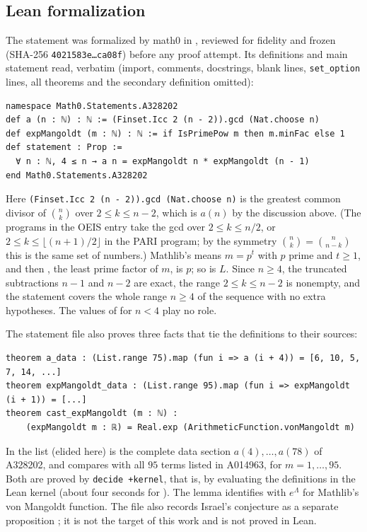 \documentclass[11pt]{amsart}
\theoremstyle{plain}
\theoremstyle{definition}
\begin{document}
\subsection*{Lean formalization}
The statement was formalized by math0 in , reviewed for fidelity and frozen (SHA-256 \texttt{4021583e\ldots ca08f}) before any proof attempt. Its definitions and main statement read, verbatim (import, comments, docstrings, blank lines, \texttt{set\_option} lines, all theorems and the secondary definition  omitted):
\begin{lstlisting}
namespace Math0.Statements.A328202
def a (n : ℕ) : ℕ := (Finset.Icc 2 (n - 2)).gcd (Nat.choose n)
def expMangoldt (m : ℕ) : ℕ := if IsPrimePow m then m.minFac else 1
def statement : Prop :=
  ∀ n : ℕ, 4 ≤ n → a n = expMangoldt n * expMangoldt (n - 1)
end Math0.Statements.A328202
\end{lstlisting}
Here \texttt{(Finset.Icc 2 (n - 2)).gcd (Nat.choose n)} is the greatest common divisor of $\binom nk$ over $2\le k\le n-2$, which is $a(n)$ by the discussion above. (The programs in the OEIS entry take the gcd over $2\le k\le n/2$, or $2\le k\le\lfloor (n+1)/2\rfloor$ in the PARI program; by the symmetry $\binom nk=\binom n{n-k}$ this is the same set of numbers.) Mathlib's  means $m=p^t$ with $p$ prime and $t\ge1$, and then , the least prime factor of $m$, is $p$; so  is $L$. Since $n\ge4$, the truncated subtractions $n-1$ and $n-2$ are exact, the range $2\le k\le n-2$ is nonempty, and the statement covers the whole range $n\ge4$ of the sequence with no extra hypotheses. The values of  for $n<4$ play no role.

The statement file also proves three facts that tie the definitions to their sources:
\begin{lstlisting}
theorem a_data : (List.range 75).map (fun i => a (i + 4)) = [6, 10, 5, 7, 14, ...]
theorem expMangoldt_data : (List.range 95).map (fun i => expMangoldt (i + 1)) = [...]
theorem cast_expMangoldt (m : ℕ) :
    (expMangoldt m : ℝ) = Real.exp (ArithmeticFunction.vonMangoldt m)
\end{lstlisting}
In  the list (elided here) is the complete data section $a(4),\dots,a(78)$ of A328202, and  compares  with all $95$ terms listed in A014963, for $m=1,\dots,95$. Both are proved by \texttt{decide +kernel}, that is, by evaluating the definitions in the Lean kernel (about four seconds for ). The lemma  identifies  with $e^{\Lambda}$ for Mathlib's von Mangoldt function.
The file also records Israel's conjecture as a separate proposition ; it is not the target of this work and is not proved in Lean.
\end{document}
